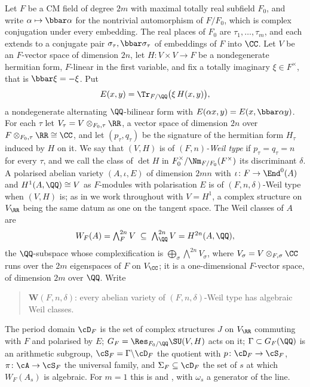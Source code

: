 \begin{setupenv}\label{setup:cmfield}
Let $F$ be a CM field of degree $2m$ with maximal totally real subfield
$F_{0}$, and write $\alpha\mapsto\bbar\alpha$ for the nontrivial automorphism
of $F/F_{0}$, which is complex conjugation under every embedding. The real
places of $F_{0}$ are $\tau_{1},\dots,\tau_{m}$, and each extends to a
conjugate pair $\sigma_{\tau},\bbar\sigma_{\tau}$ of embeddings of $F$ into
$\CC$. Let $V$ be an $F$-vector space of dimension $2n$, let
$H\colon V\times V\to F$ be a nondegenerate hermitian form, $F$-linear in the
first variable, and fix a totally imaginary $\xi\in F^{\times}$, that is
$\bbar\xi=-\xi$. Put
\[
  E(x,y)=\Tr_{F/\QQ}\bigl(\xi\,H(x,y)\bigr),
\]
a nondegenerate alternating $\QQ$-bilinear form with
$E(\alpha x,y)=E(x,\bbar\alpha y)$. For each $\tau$ let
$V_{\tau}=V\otimes_{F_{0},\tau}\RR$, a vector space of dimension $2n$ over
$F\otimes_{F_{0},\tau}\RR\cong\CC$, and let $(p_{\tau},q_{\tau})$ be the
signature of the hermitian form $H_{\tau}$ induced by $H$ on it. We say that
$(V,H)$ is of \emph{$(F,n)$-Weil type} if $p_{\tau}=q_{\tau}=n$ for every
$\tau$, and we call the class of $\det H$ in
$F_{0}^{\times}/\Nm_{F/F_{0}}(F^{\times})$ its discriminant $\delta$. A
polarised abelian variety $(A,\iota,E)$ of dimension $2mn$ with
$\iota\colon F\to\End^{0}(A)$ and $H^{1}(A,\QQ)\cong V$ as $F$-modules with
polarisation $E$ is of $(F,n,\delta)$-Weil type when $(V,H)$ is; as in
 we work throughout with $V=H^{1}$, a complex structure on
$V_{\RR}$ being the same datum as one on the tangent space. The Weil
classes of $A$ are
\[
  W_{F}(A)=\textstyle\bigwedge^{2n}_{F}V\;\subseteq\;\bigwedge^{2n}_{\QQ}V
  =H^{2n}(A,\QQ),
\]
the $\QQ$-subspace whose complexification is
$\bigoplus_{\sigma}\bigwedge^{2n}V_{\sigma}$, where $V_{\sigma}=V\otimes_{F,\sigma}\CC$
runs over the $2m$ eigenspaces of $F$ on $V_{\CC}$; it is a one-dimensional
$F$-vector space, of dimension $2m$ over $\QQ$. Write
\begin{quote}
$\mathbf{W}(F,n,\delta)$: every abelian variety of $(F,n,\delta)$-Weil type
has algebraic Weil classes.
\end{quote}
The period domain $\cD_{F}$ is the set of complex structures $J$ on
$V_{\RR}$ commuting with $F$ and polarised by $E$; $G_{F}=\Res_{F_{0}/\QQ}\SU(V,H)$
acts on it; $\Gamma\subset G_{F}(\QQ)$ is an arithmetic subgroup,
$\cS_{F}=\Gamma\backslash\cD_{F}$ the quotient with $p\colon\cD_{F}\to\cS_{F}$,
$\pi\colon\cA\to\cS_{F}$ the universal family, and
$\Sigma_{F}\subseteq\cD_{F}$ the set of $s$ at which $W_{F}(A_{s})$ is
algebraic. For $m=1$ this is  and ,
with $\omega_{s}$ a generator of the line.
\end{setupenv}

